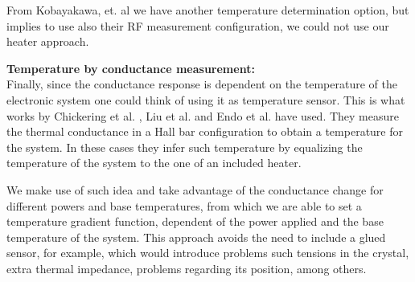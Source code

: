 From Kobayakawa, et. al \cite{kobayakawa2013diffusion} we have another temperature determination option, but implies to use also their RF measurement configuration, we could not use our heater approach.

\textcolor{azulGris}{\textbf{Temperature by conductance measurement:\\}}
Finally, since the conductance response is dependent on the temperature of the electronic system one could think of using it as temperature sensor. This is what works by Chickering et al. \cite{chickering2010thermopower}, Liu et al. \cite{Liu2018} and Endo et al.\cite{endo2019spatial} have used. They measure the thermal conductance in a Hall bar configuration to obtain a temperature for the system. 
In these cases they infer such temperature by equalizing the temperature of the system to the one of an included heater. 


We make use of such idea and take advantage of the conductance change for different powers and base temperatures, from which we are able to set a temperature gradient function, dependent of the power applied and the base temperature of the system. This approach avoids the need to include a glued sensor, for example, which would introduce problems such tensions in the crystal, extra thermal impedance, problems regarding its position, among others.


